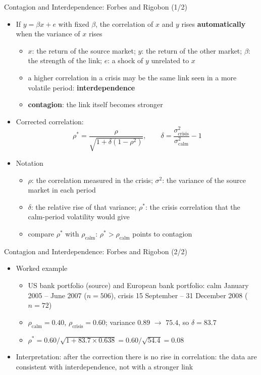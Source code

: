 \begin{frame}{Contagion and Interdependence: Forbes and Rigobon (1/2)}
\itemsize{\small}
\begin{itemize}
    \item If $y = \beta x + e$ with fixed $\beta$, the correlation of $x$ and $y$ rises \textbf{automatically} when the variance of $x$ rises 
    \begin{itemize}
        \item $x$: the return of the source market; $y$: the return of the other market; $\beta$: the strength of the link; $e$: a shock of $y$ unrelated to $x$
        \item a higher correlation in a crisis may be the same link seen in a more volatile period: \textbf{interdependence}
        \item \textbf{contagion}: the link itself becomes stronger
    \end{itemize}
    \item Corrected correlation: \[ \rho^* = \frac{\rho}{\sqrt{1 + \delta(1 - \rho^2)}}, \qquad \delta = \frac{\sigma^2_{\text{crisis}}}{\sigma^2_{\text{calm}}} - 1 \]
    \item Notation
    \begin{itemize}
        \item $\rho$: the correlation measured in the crisis; $\sigma^2$: the variance of the source market in each period
        \item $\delta$: the relative rise of that variance; $\rho^*$: the crisis correlation that the calm-period volatility would give
        \item compare $\rho^*$ with $\rho_{\text{calm}}$: $\rho^* > \rho_{\text{calm}}$ points to contagion
    \end{itemize}
\end{itemize}
\end{frame}

\begin{frame}{Contagion and Interdependence: Forbes and Rigobon (2/2)}
\itemsize{\small}
\begin{itemize}
    \item Worked example
    \begin{itemize}
        \item US bank portfolio (source) and European bank portfolio: calm January 2005 -- June 2007 ($n = 506$), crisis 15 September -- 31 December 2008 ($n = 72$)
        \item $\rho_{\text{calm}} = 0.40$, $\rho_{\text{crisis}} = 0.60$; variance $0.89$ $\to$ $75.4$, so $\delta = 83.7$
        \item $\rho^* = 0.60/\sqrt{1 + 83.7 \times 0.638} = 0.60/\sqrt{54.4} = 0.08$
    \end{itemize}
    \item Interpretation: after the correction there is no rise in correlation: the data are consistent with interdependence, not with a stronger link
\end{itemize}
\end{frame}

